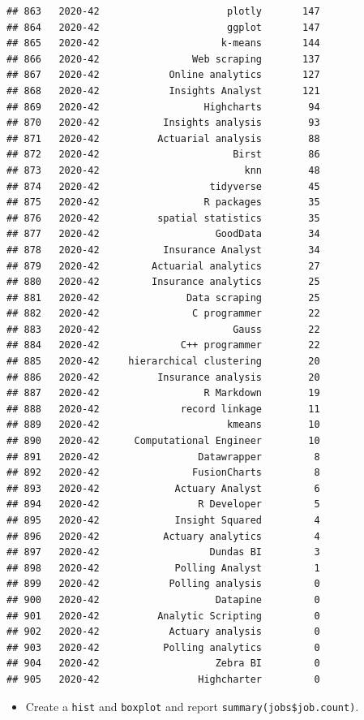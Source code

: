 \documentclass[
]{article}
\providecommand{\tightlist}{%
  \setlength{\itemsep}{0pt}\setlength{\parskip}{0pt}}
\begin{document}
\begin{verbatim}
## 863   2020-42                      plotly       147
## 864   2020-42                      ggplot       147
## 865   2020-42                     k-means       144
## 866   2020-42                Web scraping       137
## 867   2020-42            Online analytics       127
## 868   2020-42            Insights Analyst       121
## 869   2020-42                  Highcharts        94
## 870   2020-42           Insights analysis        93
## 871   2020-42          Actuarial analysis        88
## 872   2020-42                       Birst        86
## 873   2020-42                         knn        48
## 874   2020-42                   tidyverse        45
## 875   2020-42                  R packages        35
## 876   2020-42          spatial statistics        35
## 877   2020-42                    GoodData        34
## 878   2020-42           Insurance Analyst        34
## 879   2020-42         Actuarial analytics        27
## 880   2020-42         Insurance analytics        25
## 881   2020-42               Data scraping        25
## 882   2020-42                C programmer        22
## 883   2020-42                       Gauss        22
## 884   2020-42              C++ programmer        22
## 885   2020-42     hierarchical clustering        20
## 886   2020-42          Insurance analysis        20
## 887   2020-42                  R Markdown        19
## 888   2020-42              record linkage        11
## 889   2020-42                      kmeans        10
## 890   2020-42      Computational Engineer        10
## 891   2020-42                 Datawrapper         8
## 892   2020-42                FusionCharts         8
## 893   2020-42             Actuary Analyst         6
## 894   2020-42                 R Developer         5
## 895   2020-42             Insight Squared         4
## 896   2020-42           Actuary analytics         4
## 897   2020-42                   Dundas BI         3
## 898   2020-42             Polling Analyst         1
## 899   2020-42            Polling analysis         0
## 900   2020-42                    Datapine         0
## 901   2020-42          Analytic Scripting         0
## 902   2020-42            Actuary analysis         0
## 903   2020-42           Polling analytics         0
## 904   2020-42                    Zebra BI         0
## 905   2020-42                 Highcharter         0
\end{verbatim}

\begin{itemize}
\tightlist
\item
  Create a \texttt{hist} and \texttt{boxplot} and report
  \texttt{summary(jobs\$job.count)}.
\end{itemize}
\end{document}
